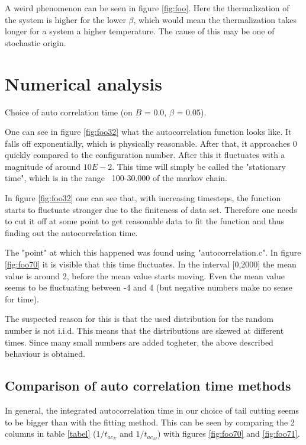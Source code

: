 \documentclass[11pt,a4paper]{article}
\begin{document}
A weird phenomenon can be seen in figure \ref{fig:foo}. Here the thermalization of the system is higher for the lower $\beta$, which would mean the thermalization takes longer for a system a higher temperature. The cause of this may be one of stochastic origin. 




\section{Numerical analysis}

Choice of auto correlation time (on $B$ = 0.0, $\beta$ = 0.05).

One can see in figure \ref{fig:foo32} what the autocorrelation function looks like. It falls off exponentially, which is physically reasonable. After that, it approaches 0 quickly compared to the configuration number. After this it fluctuates with a magnitude of around $10E-2$. This time will simply be called the "stationary time", which is in the range ~100-30.000 of the markov chain.

In figure \ref{fig:foo32} one can see that, with increasing timesteps, the function starts to fluctuate stronger due to the finiteness of data set. Therefore one needs to cut it off at some point to get reasonable data to fit the function and thus finding out the autocorrelation time.

The "point" at which this happened was found using "autocorrelation.c". In figure \ref{fig:foo70} it is visible that this time fluctuates. In the interval [0,2000] the mean value is around 2, before the mean value starts moving. Even the mean value seems to be fluctuating between -4 and 4 (but negative numbers make no sense for time).

The suspected reason for this is that the used distribution for the random number is not i.i.d. This means that the distributions are skewed at different times. Since many small numbers are added togheter, the above described behaviour is obtained.

\subsection{Comparison of auto correlation time methods}

In general, the integrated autocorrelation time in our choice of tail cutting seems to be bigger than with the fitting method. This can be seen by comparing the 2 columns in table \ref{tabel} ($1/t_{ac_E}$ and $1/t_{ac_M}$) with figures \ref{fig:foo70} and \ref{fig:foo71}.
\end{document}
